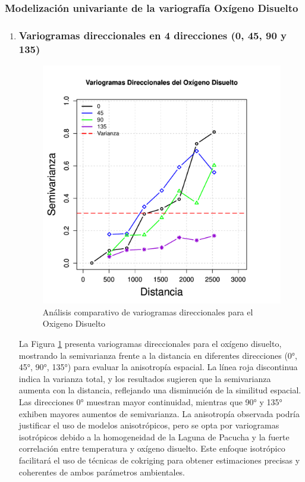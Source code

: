   \subsubsection{Modelización univariante de la variografía Oxígeno Disuelto }
\begin{enumerate}
    \item \subsubsection{Variogramas direccionales en 4 direcciones (0, 45, 90 y 135)}

\begin{figure}[!htb]
    \centering
    \includegraphics[width=0.8\linewidth]{Figuras_AED//VARIO_OD/OD_Vario4DEstimation.pdf}
    \caption{Análisis comparativo de variogramas direccionales para el Oxigeno Disuelto}
    \label{fig:enter-labelxfg}
\end{figure}

La Figura \ref{fig:enter-labelxfg} presenta variogramas direccionales para el oxígeno disuelto, mostrando la semivarianza frente a la distancia en diferentes direcciones (0°, 45°, 90°, 135°) para evaluar la anisotropía espacial. La línea roja discontinua indica la varianza total, y los resultados sugieren que la semivarianza aumenta con la distancia, reflejando una disminución de la similitud espacial. Las direcciones 0° muestran mayor continuidad, mientras que 90° y 135° exhiben mayores aumentos de semivarianza. La anisotropía observada podría justificar el uso de modelos anisotrópicos, pero se opta por variogramas isotrópicos debido a la homogeneidad de la Laguna de Pacucha y la fuerte correlación entre temperatura y oxígeno disuelto. Este enfoque isotrópico facilitará el uso de técnicas de cokriging para obtener estimaciones precisas y coherentes de ambos parámetros ambientales.



\end{enumerate}
